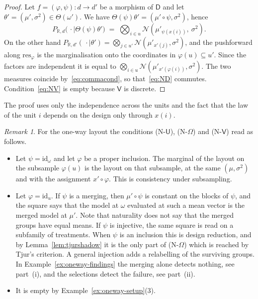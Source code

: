 \documentclass[11pt,a4paper]{article}
\theoremstyle{plain}
\theoremstyle{definition}
\theoremstyle{remark}
\newtheorem{remark}[theorem]{Remark}
\newcommand{\cat}[1]{\mathsf{#1}}
\newcommand{\catU}{\cat{U}}
\newcommand{\catV}{\cat{V}}
\newcommand{\catO}{\cat{\Omega}}
\newcommand{\catD}{\cat{D}}
\newcommand{\id}{\mathrm{id}}
\newcommand{\R}{\mathbb{R}}
\newcommand{\Norm}{\mathcal{N}}
\newcommand{\res}{\mathrm{res}}
\begin{document}
\begin{proof}
Let $f = (\varphi,\psi) \colon d \to d'$ be a morphism of $\catD$ and let
$\theta' = (\mu',\sigma^{2}) \in \Theta(\omega')$. We have
$\Theta(\psi)\theta' = (\mu' \circ \psi,\sigma^{2})$, hence
\[
P_{\R,d}\bigl(\,\cdot \mid \Theta(\psi)\theta'\bigr)
\;=\; \bigotimes_{i \in u} \Norm(\mu'_{\psi(x(i))},\ \sigma^{2}).
\]
On the other hand
$P_{\R,d'}(\,\cdot \mid \theta') = \bigotimes_{j \in u'}
\Norm(\mu'_{x'(j)},\sigma^{2})$, and the pushforward along $\res_{\varphi}$ is
the marginalisation onto the coordinates in $\varphi(u) \subseteq u'$. Since
the factors are independent it is equal to
$\bigotimes_{i \in u} \Norm(\mu'_{x'(\varphi(i))},\sigma^{2})$. The two
measures coincide by~\eqref{eq:commacond}, so that~\eqref{eq:ND} commutes.
Condition~\eqref{eq:NV} is empty because $\catV$ is discrete.
\end{proof}

The proof uses only the independence across the units and the fact that the
law of the unit $i$ depends on the design only through $x(i)$.

\begin{remark}\label{rem:oneway-slots}
For the one-way layout the conditions (N-$\catU$), (N-$\catO$) and
(N-$\catV$) read as follows.
\begin{itemize}
\item[(N-$\catU$)] Let $\psi = \id_{\omega}$ and let $\varphi$ be a proper
inclusion. The marginal of the layout on the subsample $\varphi(u)$ is the
layout on that subsample, at the same $(\mu,\sigma^{2})$ and with the
assignment $x' \circ \varphi$. This is consistency under subsampling.
\item[(N-$\catO$)] Let $\varphi = \id_{u}$. If $\psi$ is a merging, then
$\mu' \circ \psi$ is constant on the blocks of $\psi$, and the square says
that the model at $\omega$ evaluated at such a mean vector is the merged model
at $\mu'$. Note that naturality does not say that the merged groups have equal
means. If $\psi$ is injective, the same square is read on a subfamily of
treatments. When $\psi$ is an inclusion this is design reduction, and by
Lemma~\ref{lem:tjurshadow} it is the only part of (N-$\catO$) which is reached
by Tjur's criterion. A general injection adds a relabelling of the surviving
groups. In Example~\ref{ex:oneway-findings} the merging alone detects nothing,
see part~(i), and the selections detect the failure, see part~(ii).
\item[(N-$\catV$)] It is empty by
Example~\ref{ex:oneway-setup}(3).
\end{itemize}
\end{remark}
\end{document}
